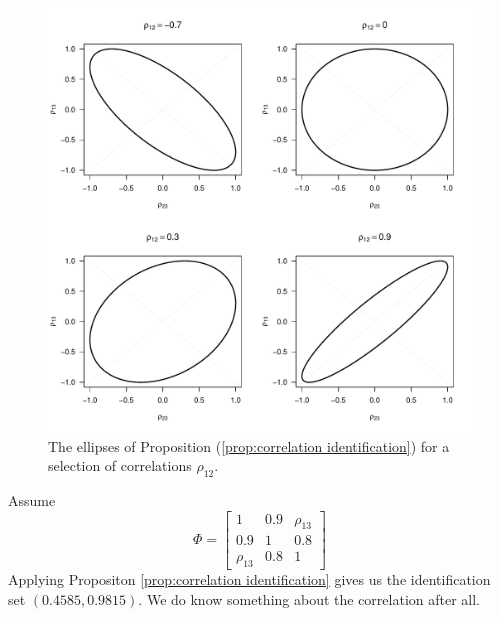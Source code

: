 \begin{figure}
\noindent \begin{centering}
\includegraphics[scale=0.4]{chunks/rho}
\par\end{centering}
\caption{The ellipses of Proposition (\ref{prop:correlation identification})
for a selection of correlations $\rho_{12}$.}
\end{figure}
%
\begin{example}
 Assume 
\[
\Phi=\left[\begin{array}{ccc}
1 & 0.9 & \rho_{13}\\
0.9 & 1 & 0.8\\
\rho_{13} & 0.8 & 1
\end{array}\right]
\]
Applying Propositon \ref{prop:correlation identification} gives us
the identification set $(0.4585,0.9815)$. We do know something about
the correlation after all.
\end{example}


